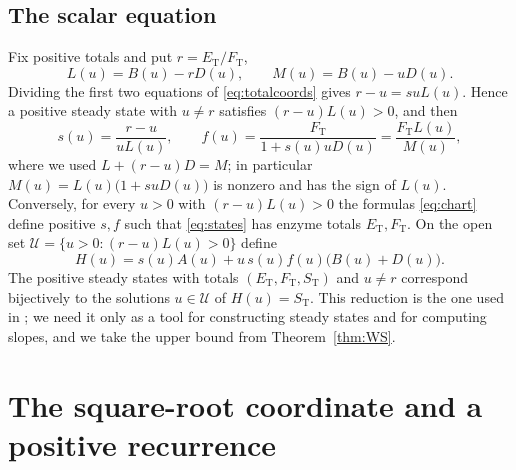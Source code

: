 \documentclass[11pt]{article}
\theoremstyle{plain}
\theoremstyle{definition}
\theoremstyle{remark}
\numberwithin{equation}{section}
\newcommand{\ET}{E_{\mathrm T}}
\newcommand{\FT}{F_{\mathrm T}}
\newcommand{\ST}{S_{\mathrm T}}
\begin{document}
\subsection*{The scalar equation}
Fix positive totals and put \(r=\ET/\FT\),
\begin{equation}\label{eq:LM}
 L(u)=B(u)-rD(u),\qquad M(u)=B(u)-uD(u).
\end{equation}
Dividing the first two equations of \eqref{eq:totalcoords} gives \(r-u=suL(u)\). Hence a
positive steady state with \(u\ne r\) satisfies \((r-u)L(u)>0\), and then
\begin{equation}\label{eq:chart}
 s(u)=\frac{r-u}{uL(u)},\qquad
 f(u)=\frac{\FT}{1+s(u)uD(u)}=\frac{\FT L(u)}{M(u)},
\end{equation}
where we used \(L+(r-u)D=M\); in particular \(M(u)=L(u)\bigl(1+suD(u)\bigr)\) is nonzero and
has the sign of \(L(u)\). Conversely, for every \(u>0\) with \((r-u)L(u)>0\) the formulas
\eqref{eq:chart} define positive \(s,f\) such that \eqref{eq:states} has enzyme totals
\(\ET,\FT\). On the open set \(\mathcal U=\{u>0:(r-u)L(u)>0\}\) define
\begin{equation}\label{eq:H}
 H(u)=s(u)A(u)+u\,s(u)f(u)\bigl(B(u)+D(u)\bigr).
\end{equation}
The positive steady states with totals \((\ET,\FT,\ST)\) and \(u\ne r\) correspond bijectively
to the solutions \(u\in\mathcal U\) of \(H(u)=\ST\). This reduction is the one used in
\cite{WangSontag2008}; we need it only as a tool for constructing steady states and for
computing slopes, and we take the upper bound from Theorem~\ref{thm:WS}.

\section{The square-root coordinate and a positive recurrence}\label{sec:recurrence}
\end{document}

